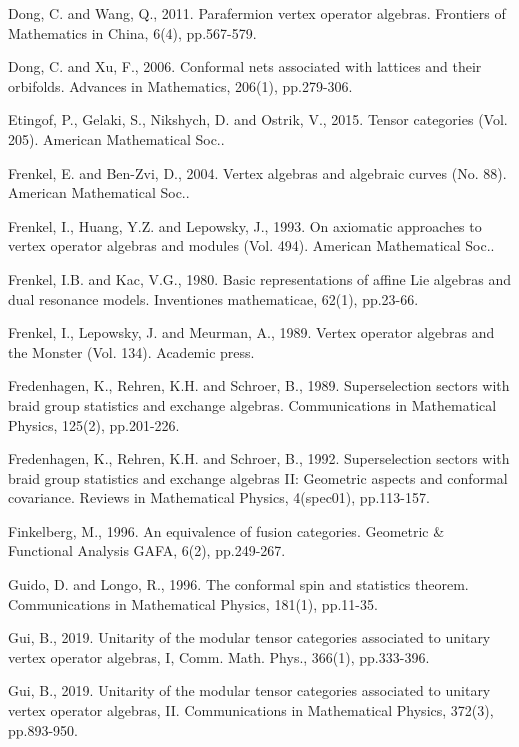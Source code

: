 \documentclass[12pt,a4paper]{article}
\theoremstyle{definition}
\theoremstyle{plain}
\numberwithin{equation}{subsection}
\begin{document}
\begin{thebibliography}{999999}
Dong, C. and Wang, Q., 2011. Parafermion vertex operator algebras. Frontiers of Mathematics in China, 6(4), pp.567-579.

Dong, C. and Xu, F., 2006. Conformal nets associated with lattices and their orbifolds. Advances in Mathematics, 206(1), pp.279-306.

Etingof, P., Gelaki, S., Nikshych, D. and Ostrik, V., 2015. Tensor categories (Vol. 205). American Mathematical Soc..

Frenkel, E. and Ben-Zvi, D., 2004. Vertex algebras and algebraic curves (No. 88). American Mathematical Soc..

Frenkel, I., Huang, Y.Z. and Lepowsky, J., 1993. On axiomatic approaches to vertex operator algebras and modules (Vol. 494). American Mathematical Soc..

Frenkel, I.B. and Kac, V.G., 1980. Basic representations of affine Lie algebras and dual resonance models. Inventiones mathematicae, 62(1), pp.23-66.

Frenkel, I., Lepowsky, J. and Meurman, A., 1989. Vertex operator algebras and the Monster (Vol. 134). Academic press.

Fredenhagen, K., Rehren, K.H. and Schroer, B., 1989. Superselection sectors with braid group statistics and exchange algebras. Communications in Mathematical Physics, 125(2), pp.201-226.

Fredenhagen, K., Rehren, K.H. and Schroer, B., 1992. Superselection sectors with braid group statistics and exchange algebras II: Geometric aspects and conformal covariance. Reviews in Mathematical Physics, 4(spec01), pp.113-157.


Finkelberg, M., 1996. An equivalence of fusion categories. Geometric \& Functional Analysis GAFA, 6(2), pp.249-267.

Guido, D. and Longo, R., 1996. The conformal spin and statistics theorem. Communications in Mathematical Physics, 181(1), pp.11-35.



Gui, B., 2019. Unitarity of the modular tensor categories associated to unitary vertex operator algebras, I,  Comm. Math. Phys., 366(1), pp.333-396. 

Gui, B., 2019. Unitarity of the modular tensor categories associated to unitary vertex operator algebras, II. Communications in Mathematical Physics, 372(3), pp.893-950.


\end{thebibliography}
\end{document}
